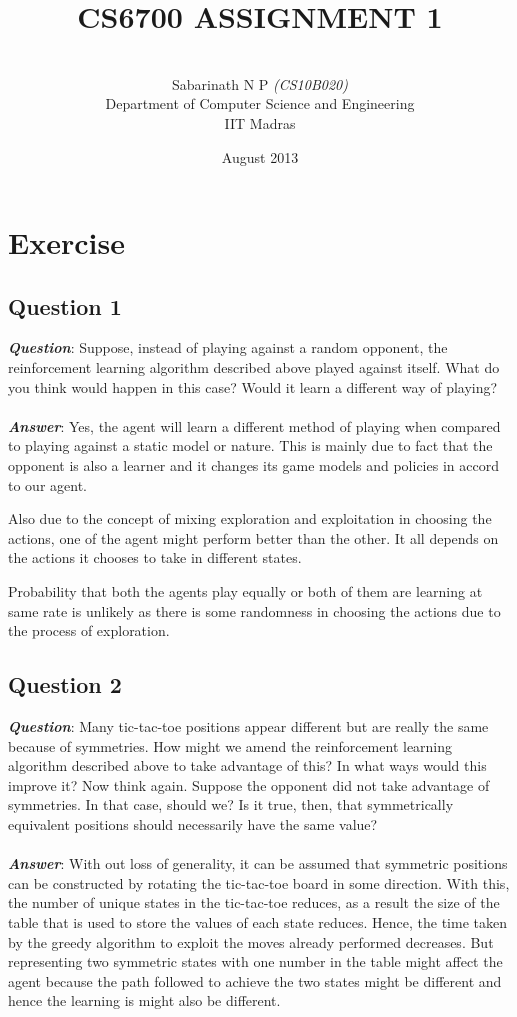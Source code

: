 \documentclass[a4paper,10pt]{report}
\title{\huge{\textbf{CS6700 ASSIGNMENT 1}}}
\author{\\[0.5cm] Sabarinath N P \emph{(CS10B020)}
	\\[0.5cm] Department of Computer Science and Engineering \\[0.2cm]
	IIT Madras\\[1.0cm]
}
\date{August 2013}
\begin{document}
\renewcommand{\thesection}{1.\arabic{section}}
\renewcommand{\thesubsection}{1.\arabic{subsection}}

\maketitle
\vfill
\setcounter{tocdepth}{2}

\section*{Exercise}

\subsection{Question 1}
\textbf{\emph{Question}}: Suppose, instead of playing against a random opponent, the reinforcement learning algorithm described above played against itself. What do you think would happen in this case? Would it learn a different way of playing?
\\\\
\textbf{\emph{Answer}}: Yes, the agent will learn a different method of playing when compared to playing against a static model or nature. This is mainly due to fact that the opponent is also a learner and it changes its game models and policies in accord to our agent.

Also due to the concept of mixing exploration and exploitation in choosing the actions, one of the agent might perform better than the other. It all depends on the actions it chooses to take in different states.

Probability that both the agents play equally or both of them are learning at same rate is unlikely as there is some randomness in choosing the actions due to the process of exploration.

\subsection{Question 2}
\textbf{\emph{Question}}: Many tic-tac-toe positions appear different but are really the same because of symmetries. How might we amend the reinforcement learning algorithm described above to take advantage of this? In what ways would this improve it? Now think again. Suppose the opponent did not take advantage of symmetries. In that case, should we? Is it true, then, that symmetrically equivalent positions should necessarily have the same value?
\\\\
\textbf{\emph{Answer}}: With out loss of generality, it can be assumed that symmetric positions can be constructed by rotating the tic-tac-toe board in some direction. With this, the number of unique states in the tic-tac-toe reduces, as a result the size of the table that is used to store the values of each state reduces. Hence, the time taken by the greedy algorithm to exploit the moves already performed decreases. But representing two symmetric states with one number in the table might affect the agent because the path followed to achieve the two states might be different and hence the learning is might also be different.
\end{document}
